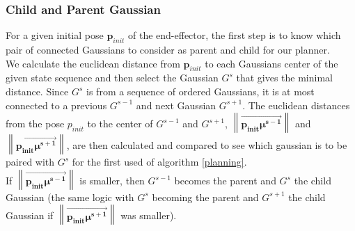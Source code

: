 \documentclass[letterpaper, 10 pt, conference]{ieeeconf}  %
\newcommand{\mb}[1]{{\boldsymbol{#1}}}
\newcommand\norm[1]{\left\lVert#1\right\rVert}
\begin{document}
\subsubsection{Child and Parent Gaussian}\leavevmode\par
For a given initial pose $\mb{p}_{init}$ of the end-effector, the first step is to know which pair of connected Gaussians to consider as parent and child for our planner.\\
We calculate the euclidean distance from $\mb{p}_{init}$ to each Gaussians center of the given state sequence and then select the Gaussian $G^s$ that gives the minimal distance.
Since $G^{s}$ is from a sequence of ordered Gaussians, it is at most connected to a previous $G^{s-1}$ and next Gaussian $G^{s+1}$.  The euclidean distances from the pose $p_{init}$ to the center of $G^{s-1}$ and $G^{s+1}$, $\norm{\overrightarrow{\mb{p_{init}}\mb{\mu^{s-1}}}}$ and $\norm{\overrightarrow{\mb{p_{init}}\mb{\mu^{s+1}}}}$, are then calculated and compared to see which gaussian is to be paired with $G^s$ for the first used of algorithm \ref{planning}.\\
If $\norm{\overrightarrow{\mb{p_{init}}\mb{\mu^{s-1}}}}$ is smaller, then $G^{s-1}$ becomes the parent and $G^{s}$ the child Gaussian (the same logic with  $G^{s}$ becoming the parent and $G^{s+1}$ the child Gaussian if $\norm{\overrightarrow{\mb{p_{init}}\mb{\mu^{s+1}}}}$ was smaller).\\
\end{document}
